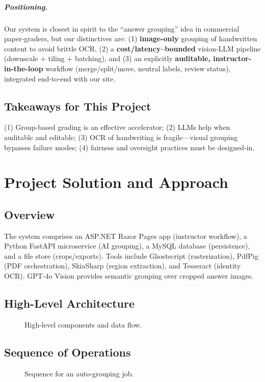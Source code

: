 \documentclass[ms,twoside,print]{nuthesis}
\begin{document}
\paragraph{Positioning.}
Our system is closest in spirit to the \enquote{answer grouping} idea in commercial paper-graders, but
our distinctives are: (1) \textbf{image-only} grouping of handwritten content to avoid brittle OCR,
(2) a \textbf{cost/latency–bounded} vision-LLM pipeline (downscale + tiling + batching), and
(3) an explicitly \textbf{auditable, instructor-in-the-loop} workflow (merge/split/move, neutral labels,
review status), integrated end-to-end with our site.

\section{Takeaways for This Project}
(1) Group-based grading is an effective accelerator; (2) LLMs help when auditable and editable; (3) OCR of handwriting is fragile—visual grouping bypasses failure modes; (4) fairness and oversight practices must be designed-in.

\chapter{Project Solution and Approach}\label{chap:solution}

\section{Overview}
The system comprises an ASP.NET Razor Pages app (instructor workflow), a Python FastAPI microservice (AI grouping), a MySQL database (persistence), and a file store (crops/exports). Tools include Ghostscript (rasterization), PdfPig (PDF orchestration), SkiaSharp (region extraction), and Tesseract (identity OCR). GPT-4o Vision provides semantic grouping over cropped answer images.

\section{High-Level Architecture}
\begin{figure}[htb]
  \centering
  \resizebox{\textwidth}{!}{}
  \caption{High-level components and data flow.}
  \label{fig:architecture}
\end{figure}

\section{Sequence of Operations}
\begin{figure}[htb]
  \centering
  
  \caption{Sequence for an auto-grouping job.}
  \label{fig:sequence}
\end{figure}
\end{document}

